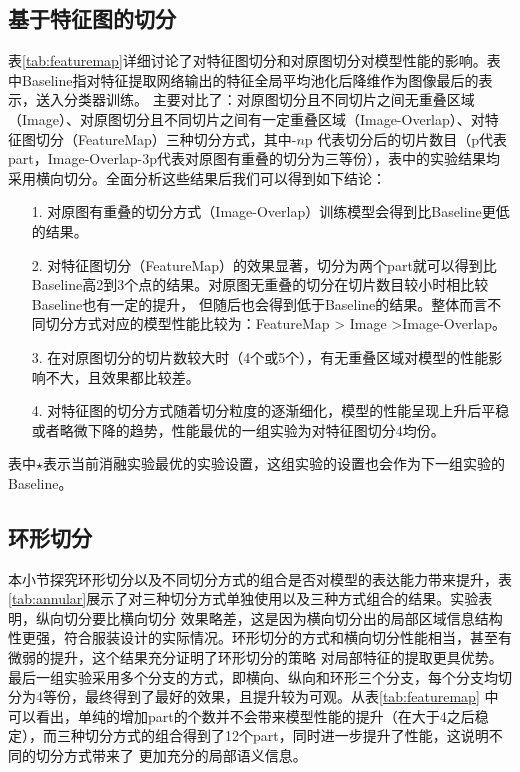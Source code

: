 \subsection{基于特征图的切分}

表\ref{tab:featuremap}详细讨论了对特征图切分和对原图切分对模型性能的影响。表中Baseline指对特征提取网络输出的特征全局平均池化后降维作为图像最后的表示，送入分类器训练。
主要对比了：对原图切分且不同切片之间无重叠区域（Image）、对原图切分且不同切片之间有一定重叠区域（Image-Overlap）、对特征图切分（FeatureMap）三种切分方式，其中-$n$p
代表切分后的切片数目（p代表part，Image-Overlap-3p代表对原图有重叠的切分为三等份），表中的实验结果均采用横向切分。全面分析这些结果后我们可以得到如下结论：
\begin{itemize}
  \item[1.]对原图有重叠的切分方式（Image-Overlap）训练模型会得到比Baseline更低的结果。
  \item[2.]对特征图切分（FeatureMap）的效果显著，切分为两个part就可以得到比Baseline高2到3个点的结果。对原图无重叠的切分在切片数目较小时相比较Baseline也有一定的提升，
    但随后也会得到低于Baseline的结果。整体而言不同切分方式对应的模型性能比较为：FeatureMap > Image >Image-Overlap。
  \item[3.]在对原图切分的切片数较大时（4个或5个），有无重叠区域对模型的性能影响不大，且效果都比较差。
  \item[4.]对特征图的切分方式随着切分粒度的逐渐细化，模型的性能呈现上升后平稳或者略微下降的趋势，性能最优的一组实验为对特征图切分4均份。
\end{itemize}

表中$\star$表示当前消融实验最优的实验设置，这组实验的设置也会作为下一组实验的Baseline。
\subsection{环形切分}
本小节探究环形切分以及不同切分方式的组合是否对模型的表达能力带来提升，表\ref{tab:annular}展示了对三种切分方式单独使用以及三种方式组合的结果。实验表明，纵向切分要比横向切分
效果略差，这是因为横向切分出的局部区域信息结构性更强，符合服装设计的实际情况。环形切分的方式和横向切分性能相当，甚至有微弱的提升，这个结果充分证明了环形切分的策略
对局部特征的提取更具优势。最后一组实验采用多个分支的方式，即横向、纵向和环形三个分支，每个分支均切分为4等份，最终得到了最好的效果，且提升较为可观。从表\ref{tab:featuremap}
中可以看出，单纯的增加part的个数并不会带来模型性能的提升（在大于4之后稳定），而三种切分方式的组合得到了12个part，同时进一步提升了性能，这说明不同的切分方式带来了
更加充分的局部语义信息。


